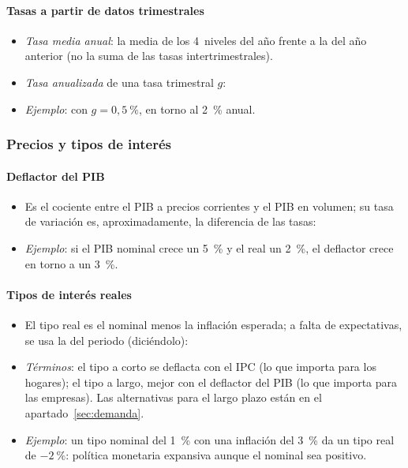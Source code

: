 \documentclass[11pt]{article}
\begin{document}
\paragraph{Tasas a partir de datos trimestrales}
\begin{itemize}
\item \emph{Tasa media anual}: la media de los 4~niveles del año frente a la del año anterior (no la suma de las tasas intertrimestrales).
\item \emph{Tasa anualizada} de una tasa trimestral $g$:
\item \emph{Ejemplo}: con $g=0{,}5~\%$, en torno al 2~\% anual.
\end{itemize}

\subsubsection{Precios y tipos de interés}\label{anexo:calc-precios}

\paragraph{Deflactor del PIB}
\begin{itemize}
\item Es el cociente entre el PIB a precios corrientes y el PIB en volumen; su tasa de variación es, aproximadamente, la diferencia de las tasas:
\item \emph{Ejemplo}: si el PIB nominal crece un 5~\% y el real un 2~\%, el deflactor crece en torno a un 3~\%.
\end{itemize}

\paragraph{Tipos de interés reales}
\begin{itemize}
\item El tipo real es el nominal menos la inflación esperada; a falta de expectativas, se usa la del periodo (diciéndolo):
\item \emph{Términos}: el tipo a corto se deflacta con el IPC (lo que importa para los hogares); el tipo a largo, mejor con el deflactor del PIB (lo que importa para las empresas). Las alternativas para el largo plazo están en el apartado~\ref{sec:demanda}.
\item \emph{Ejemplo}: un tipo nominal del 1~\% con una inflación del 3~\% da un tipo real de $-2~\%$: política monetaria expansiva aunque el nominal sea positivo.
\end{itemize}
\end{document}

